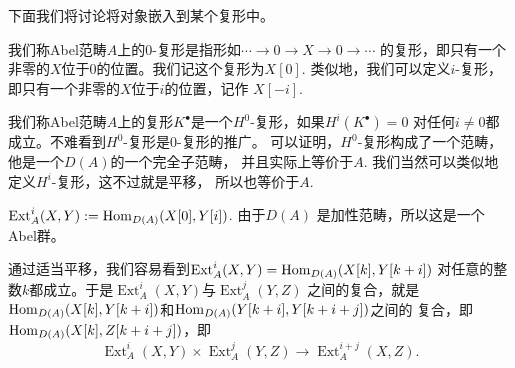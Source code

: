 

下面我们将讨论将对象嵌入到某个复形中。

\begin{para}
我们称Abel范畴$A$上的$0$-复形是指形如$\cdots \to 0\to X\to 0\to \cdots$
的复形，即只有一个非零的$X$位于$0$的位置。我们记这个复形为$X[0]$.
类似地，我们可以定义$i$-复形，即只有一个非零的$X$位于$i$的位置，记作
$X[-i]$.

我们称Abel范畴$A$上的复形$K^\bullet$是一个$H^0$-复形，如果$H^i(K^\bullet)=0$
对任何$i\neq 0$都成立。不难看到$H^0$-复形是$0$-复形的推广。
可以证明，$H^0$-复形构成了一个范畴，他是一个$D(A)$的一个完全子范畴，
并且实际上等价于$A$. 我们当然可以类似地定义$H^i$-复形，这不过就是平移，
所以也等价于$A$.
\end{para}

\begin{para}
    $\operatorname{Ext}_A^i(X,Y):=\operatorname{Hom}_{D(A)}(X[0],Y[i])$. 由于$D(A)$
    是加性范畴，所以这是一个Abel群。
\end{para}

通过适当平移，我们容易看到$\operatorname{Ext}_A^i(X,Y)=\operatorname{Hom}_{D(A)}(X[k],Y[k+i])$
对任意的整数$k$都成立。于是$\operatorname{Ext}_A^i(X,Y)$与$\operatorname{Ext}_A^j(Y,Z)$
之间的复合，就是$\operatorname{Hom}_{D(A)}(X[k],Y[k+i])$和$\operatorname{Hom}_{D(A)}(Y[k+i],Y[k+i+j])$之间的
复合，即$\operatorname{Hom}_{D(A)}(X[k],Z[k+i+j])$，即
\[
    \operatorname{Ext}_A^i(X,Y)\times  \operatorname{Ext}_A^j(Y,Z)
    \to \operatorname{Ext}_A^{i+j}(X,Z).
\]

